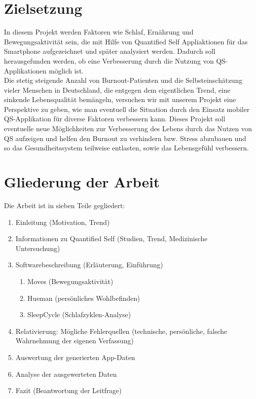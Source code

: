 \section{Zielsetzung}
\label{ch:Einleitung:sec:Zielsetzung}

In diesem Projekt werden Faktoren wie Schlaf, Ernährung und Bewegungsaktivität sein, die mit Hilfe von Quantified Self Appliaktionen für das Smartphone aufgezeichnet und später analysiert werden. %
Dadurch soll herausgefunden werden, ob eine Verbesserung durch die Nutzung von QS-Applikationen möglich ist. \\
Die stetig steigende Anzahl von Burnout-Patienten und die Selbsteinschätzung vieler Menschen in Deutschland, die entgegen dem eigentlichen Trend, eine sinkende Lebensqualität bemängeln, versuchen wir mit unserem Projekt eine Perspektive zu geben, wie man eventuell die Situation durch den Einsatz mobiler QS-Applikation für diverse Faktoren verbessern kann. 
Dieses Projekt soll eventuelle neue Möglichkeiten zur Verbesserung des Lebens durch das Nutzen von QS aufzeigen und helfen den Burnout zu verhindern bzw. Stress abzubauen und so das Gesundheitssystem teilweise entlasten, sowie das Lebensgefühl verbessern. 

\section{Gliederung der Arbeit}
\label{ch:Einleitung:sec:gliederung-der-arbeit}

Die Arbeit ist in sieben Teile gegliedert:

\begin{enumerate}
\def\labelenumi{\arabic{enumi}.}
\itemsep1pt\parskip0pt
\item
  Einleitung (Motivation, Trend)
\item
  Informationen zu Quantified Self (Studien, Trend, Medizinische
  Untersuchung)
\item
  Softwarebeschreibung (Erläuterung, Einführung)

  \begin{enumerate}
  \def\labelenumii{\alph{enumii}.}
  \itemsep1pt\parskip0pt
  \item
    Moves (Bewegungsaktivität)\\
  \item
    Hueman (persönliches Wohlbefinden)\\
  \item
    SleepCycle (Schlafzyklen-Analyse)
  \end{enumerate}
\item
  Relativierung: Mögliche Fehlerquellen (technische, persönliche,
  falsche Wahrnehmung der eigenen Verfassung)
\item
  Auswertung der generierten App-Daten
\item
  Analyse der ausgewerteten Daten
\item
  Fazit (Beantwortung der Leitfrage)
\end{enumerate}

